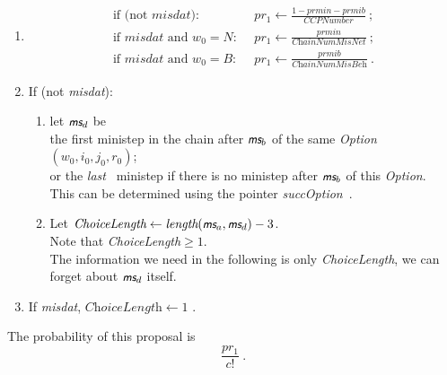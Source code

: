 \documentclass[a4paper,12pt,fleqn]{article}
\newcommand{\nnm}[1]{\textsf{\small\textit{#1}\ }}
\newcommand{\ms}{\textsl{\textsf{\small ms}}} %
\begin{document}
\begin{enumerate}[resume]
\item
      \begin{align*}
      \text{if (not } \textit{misdat}):\ \ & pr_1 \leftarrow
   \frac{1 - \textit{prmin} - \textit{prmib}}{\textit{CCPNumber} } \ ; \\[1em]
       \text{if } \textit{misdat} \text{ and } w_0 = N:\  \ & pr_1 \leftarrow
                   \frac{\textit{prmin}}{\textit{ChainNumMisNet} } \ ; \\[1em]
       \text{if } \textit{misdat} \text{ and } w_0 = B:\ \ & pr_1 \leftarrow
                 \frac{\textit{prmib}}{\textit{ChainNumMisBeh} } \ .
      \end{align*}
 \item If (not \textit{misdat}):
      \begin{enumerate}
      \item let $\ms_d$ be \\
          the first ministep in the chain after $\ms_b$
          of the same \textit{Option} $(w_0,i_0,j_0,r_0)$; \\
          or the \nnm{last} ministep
          if there is no ministep after $\ms_b$ of this \textit{Option}.\\
          This can be determined using the pointer \nnm{succOption}.
      \item       Let $\textit{ChoiceLength} \leftarrow \textit{length}(\ms_a, \ms_d ) - 3$.\\
      Note that \textit{ChoiceLength}$ \geq 1$.\\
      The information we need in the following is only \textit{ChoiceLength},
      we can forget about $\ms_d$ itself.
      \end{enumerate}
\item If \textit{misdat}, $\textit{ChoiceLength} \leftarrow 1$ . \\
\end{enumerate}
The probability of this proposal is
\[
\frac{pr_1}{c!} \ .
\]
\end{document}
